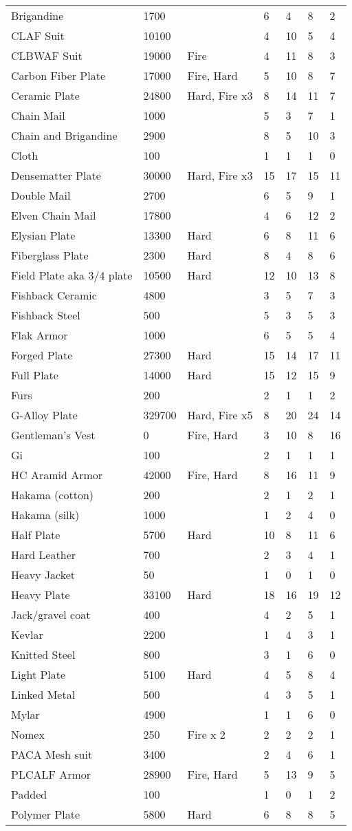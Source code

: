 \documentclass[twoside]{book}
\begin{document}
\begin{longtable}{p{1.25in}llp{2em}p{2em}p{2em}p{2em}}
      \raggedright Brigandine&1700&&6&4&8&2\tabularnewline
      \raggedright CLAF Suit&10100&&4&10&5&4\tabularnewline
      \raggedright CLBWAF Suit&19000&Fire&4&11&8&3\tabularnewline
      \raggedright Carbon Fiber Plate&17000&Fire, Hard&5&10&8&7\tabularnewline
      \raggedright Ceramic Plate&24800&Hard, Fire x3&8&14&11&7\tabularnewline
      \raggedright Chain Mail&1000&&5&3&7&1\tabularnewline
      \raggedright Chain and Brigandine&2900&&8&5&10&3\tabularnewline
      \raggedright Cloth&100&&1&1&1&0\tabularnewline
      \raggedright Densematter Plate&30000&Hard, Fire x3&15&17&15&11\tabularnewline
      \raggedright Double Mail&2700&&6&5&9&1\tabularnewline
      \raggedright Elven Chain Mail&17800&&4&6&12&2\tabularnewline
      \raggedright Elysian Plate&13300&Hard&6&8&11&6\tabularnewline
      \raggedright Fiberglass Plate&2300&Hard&8&4&8&6\tabularnewline
      \raggedright Field Plate aka 3/4 plate&10500&Hard&12&10&13&8\tabularnewline
      \raggedright Fishback Ceramic&4800&&3&5&7&3\tabularnewline
      \raggedright Fishback Steel&500&&5&3&5&3\tabularnewline
      \raggedright Flak Armor&1000&&6&5&5&4\tabularnewline
      \raggedright Forged Plate&27300&Hard&15&14&17&11\tabularnewline
      \raggedright Full Plate&14000&Hard&15&12&15&9\tabularnewline
      \raggedright Furs&200&&2&1&1&2\tabularnewline
      \raggedright G-Alloy Plate&329700&Hard, Fire x5&8&20&24&14\tabularnewline
      \raggedright Gentleman's Vest&0&Fire, Hard&3&10&8&16\tabularnewline
      \raggedright Gi&100&&2&1&1&1\tabularnewline
      \raggedright HC Aramid Armor&42000&Fire, Hard&8&16&11&9\tabularnewline
      \raggedright Hakama (cotton)&200&&2&1&2&1\tabularnewline
      \raggedright Hakama (silk)&1000&&1&2&4&0\tabularnewline
      \raggedright Half Plate&5700&Hard&10&8&11&6\tabularnewline
      \raggedright Hard Leather&700&&2&3&4&1\tabularnewline
      \raggedright Heavy Jacket&50&&1&0&1&0\tabularnewline
      \raggedright Heavy Plate&33100&Hard&18&16&19&12\tabularnewline
      \raggedright Jack/gravel coat&400&&4&2&5&1\tabularnewline
      \raggedright Kevlar&2200&&1&4&3&1\tabularnewline
      \raggedright Knitted Steel&800&&3&1&6&0\tabularnewline
      \raggedright Light Plate&5100&Hard&4&5&8&4\tabularnewline
      \raggedright Linked Metal&500&&4&3&5&1\tabularnewline
      \raggedright Mylar&4900&&1&1&6&0\tabularnewline
      \raggedright Nomex&250&Fire x 2&2&2&2&1\tabularnewline
      \raggedright PACA Mesh suit&3400&&2&4&6&1\tabularnewline
      \raggedright PLCALF Armor&28900&Fire, Hard&5&13&9&5\tabularnewline
      \raggedright Padded&100&&1&0&1&2\tabularnewline
      \raggedright Polymer Plate&5800&Hard&6&8&8&5\tabularnewline

\end{longtable}
\end{document}

